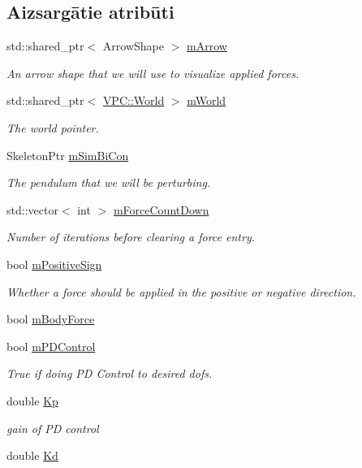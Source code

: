 \subsection*{Aizsargātie atribūti}
\begin{DoxyCompactItemize}
\item 
std\+::shared\+\_\+ptr$<$ Arrow\+Shape $>$ \hyperlink{class_my_window_a95e499f45c2bb2d92b8038300eaaa51d}{m\+Arrow}
\begin{DoxyCompactList}\small\item\em An arrow shape that we will use to visualize applied forces. \end{DoxyCompactList}\item 
std\+::shared\+\_\+ptr$<$ \hyperlink{class_v_p_c_1_1_world}{V\+P\+C\+::\+World} $>$ \hyperlink{class_my_window_a395fd6ff98a01ac7850471b7d584bf66}{m\+World}
\begin{DoxyCompactList}\small\item\em The world pointer. \end{DoxyCompactList}\item 
Skeleton\+Ptr \hyperlink{class_my_window_a61f5d7b9cf55734d36a616902420cc1e}{m\+Sim\+Bi\+Con}
\begin{DoxyCompactList}\small\item\em The pendulum that we will be perturbing. \end{DoxyCompactList}\item 
std\+::vector$<$ int $>$ \hyperlink{class_my_window_a41b65319bbba6d3154fa70e242c75cee}{m\+Force\+Count\+Down}
\begin{DoxyCompactList}\small\item\em Number of iterations before clearing a force entry. \end{DoxyCompactList}\item 
bool \hyperlink{class_my_window_a8b21e90e07f6cd150eedb8b596be4800}{m\+Positive\+Sign}
\begin{DoxyCompactList}\small\item\em Whether a force should be applied in the positive or negative direction. \end{DoxyCompactList}\item 
bool \hyperlink{class_my_window_a99865aead6e9ed47b7f6303e50ec1dff}{m\+Body\+Force}
\item 
bool \hyperlink{class_my_window_a83c40a43fe1ee6e080dbe918d4753cf3}{m\+P\+D\+Control}
\begin{DoxyCompactList}\small\item\em True if doing PD Control to desired dofs. \end{DoxyCompactList}\item 
double \hyperlink{class_my_window_aaaf55ec8565cb69f691fdc7046cc2b7e}{Kp}
\begin{DoxyCompactList}\small\item\em gain of PD control \end{DoxyCompactList}\item 
double \hyperlink{class_my_window_a2113bdacdbc4042ed43fafb852a720e4}{Kd}
\end{DoxyCompactItemize}


